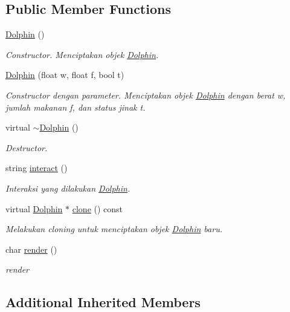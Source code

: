 \subsection*{Public Member Functions}
\begin{DoxyCompactItemize}
\item 
\hyperlink{classDolphin_a571a22b2c3cece5c8175ff49640b35bc}{Dolphin} ()
\begin{DoxyCompactList}\small\item\em Constructor. Menciptakan objek \hyperlink{classDolphin}{Dolphin}. \end{DoxyCompactList}\item 
\hyperlink{classDolphin_a024370cf7beeaef3fbdcdd5fef09e6ef}{Dolphin} (float w, float f, bool t)
\begin{DoxyCompactList}\small\item\em Constructor dengan parameter. Menciptakan objek \hyperlink{classDolphin}{Dolphin} dengan berat w, jumlah makanan f, dan status jinak t. \end{DoxyCompactList}\item 
virtual \hyperlink{classDolphin_a5c11950fe5675f3c36001f20a12343af}{$\sim$\+Dolphin} ()
\begin{DoxyCompactList}\small\item\em Destructor. \end{DoxyCompactList}\item 
string \hyperlink{classDolphin_ab2c8d89e0fb84f02b659849b2a6ad41a}{interact} ()
\begin{DoxyCompactList}\small\item\em Interaksi yang dilakukan \hyperlink{classDolphin}{Dolphin}. \end{DoxyCompactList}\item 
virtual \hyperlink{classDolphin}{Dolphin} $\ast$ \hyperlink{classDolphin_a77507b240ada79a431cb49c17c41f663}{clone} () const 
\begin{DoxyCompactList}\small\item\em Melakukan cloning untuk menciptakan objek \hyperlink{classDolphin}{Dolphin} baru. \end{DoxyCompactList}\item 
char \hyperlink{classDolphin_aa7c379b5806f594e54021429b99141a9}{render} ()
\begin{DoxyCompactList}\small\item\em render \end{DoxyCompactList}\end{DoxyCompactItemize}
\subsection*{Additional Inherited Members}


